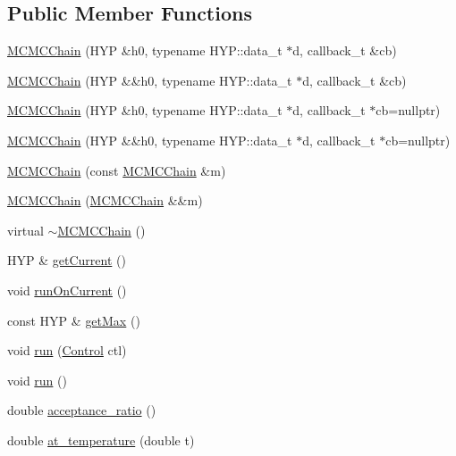 \subsection*{Public Member Functions}
\begin{DoxyCompactItemize}
\item 
\hyperlink{class_m_c_m_c_chain_aed5ffea5a46a380b8b0d78cd46c96a97}{M\+C\+M\+C\+Chain} (H\+YP \&h0, typename H\+Y\+P\+::data\+\_\+t $\ast$d, callback\+\_\+t \&cb)
\item 
\hyperlink{class_m_c_m_c_chain_a731f2ca6416f1daa84cd54cd3f9281b2}{M\+C\+M\+C\+Chain} (H\+YP \&\&h0, typename H\+Y\+P\+::data\+\_\+t $\ast$d, callback\+\_\+t \&cb)
\item 
\hyperlink{class_m_c_m_c_chain_afaa9a75b515252a8c6237aad0211a2f2}{M\+C\+M\+C\+Chain} (H\+YP \&h0, typename H\+Y\+P\+::data\+\_\+t $\ast$d, callback\+\_\+t $\ast$cb=nullptr)
\item 
\hyperlink{class_m_c_m_c_chain_a8df81470759ddd5654c5a82ad3b185cf}{M\+C\+M\+C\+Chain} (H\+YP \&\&h0, typename H\+Y\+P\+::data\+\_\+t $\ast$d, callback\+\_\+t $\ast$cb=nullptr)
\item 
\hyperlink{class_m_c_m_c_chain_a3942ff362dcc0bdfdad296f95048f14e}{M\+C\+M\+C\+Chain} (const \hyperlink{class_m_c_m_c_chain}{M\+C\+M\+C\+Chain} \&m)
\item 
\hyperlink{class_m_c_m_c_chain_a2db84c6b92af066b34eedd257d800417}{M\+C\+M\+C\+Chain} (\hyperlink{class_m_c_m_c_chain}{M\+C\+M\+C\+Chain} \&\&m)
\item 
virtual \hyperlink{class_m_c_m_c_chain_ad19438dd99bdba43b5175705e2bef156}{$\sim$\+M\+C\+M\+C\+Chain} ()
\item 
H\+YP \& \hyperlink{class_m_c_m_c_chain_ae76c66b5bcbc02df926e5f9a91acff17}{get\+Current} ()
\item 
void \hyperlink{class_m_c_m_c_chain_a4214114e0ef4adcd4badfe1440693190}{run\+On\+Current} ()
\item 
const H\+YP \& \hyperlink{class_m_c_m_c_chain_aa5c2bf3cae9a5959cab43e04b1201ed2}{get\+Max} ()
\item 
void \hyperlink{class_m_c_m_c_chain_aef30134b1915b8b494040771480d6b80}{run} (\hyperlink{struct_control}{Control} ctl)
\item 
void \hyperlink{class_m_c_m_c_chain_ae59e07a79da1bf56b01429efcb9fb312}{run} ()
\item 
double \hyperlink{class_m_c_m_c_chain_a4b2b8b51e5ba868bca024f2be737e4c6}{acceptance\+\_\+ratio} ()
\item 
double \hyperlink{class_m_c_m_c_chain_a9adc3d08662ad7035cc9d9d75a1fc5a6}{at\+\_\+temperature} (double t)
\end{DoxyCompactItemize}
